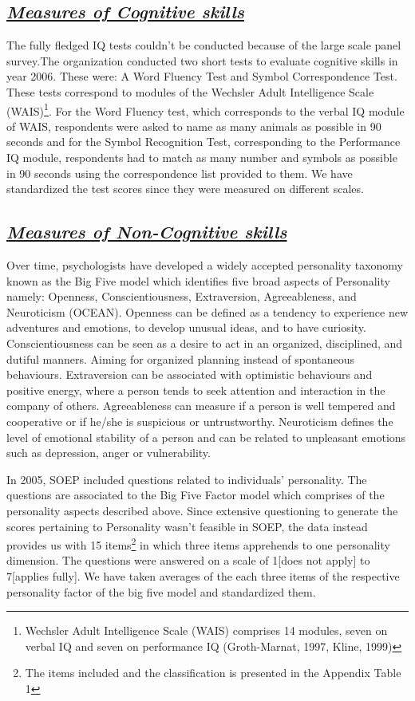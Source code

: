 \documentclass[11pt, a4paper, leqno]{article}
\begin{document}
\subsection*{\textit{\underline{Measures of Cognitive skills}}}
The fully fledged IQ tests couldn’t be conducted because of the large scale panel survey.The organization conducted two short tests to evaluate cognitive skills in year 2006. These were: A Word Fluency Test and Symbol Correspondence Test. These tests correspond to modules  of the Wechsler Adult Intelligence Scale (WAIS)\footnote{Wechsler Adult Intelligence Scale (WAIS) comprises 14 modules, seven on verbal IQ and seven on performance IQ (Groth-Marnat, 1997, Kline, 1999)}. 
For the Word Fluency test, which corresponds to the verbal IQ module of WAIS, respondents were asked to name as many animals as possible in 90 seconds and for the Symbol Recognition Test, corresponding to the Performance IQ module, respondents had to match as many number and symbols as possible in 90 seconds using the correspondence list provided to them. We have standardized the test scores since they were measured on different scales.

\subsection*{\textit{\underline{Measures of Non-Cognitive skills}}}

Over time, psychologists have developed a widely accepted personality taxonomy known as the Big Five model which identifies five broad aspects of Personality namely: Openness, Conscientiousness, Extraversion, Agreeableness, and Neuroticism 
(OCEAN). Openness can be defined as a tendency to experience new adventures and emotions, to develop unusual ideas, and to have curiosity. Conscientiousness can be seen as a desire to act in an organized, disciplined, and dutiful manners. Aiming for organized planning instead of spontaneous behaviours. Extraversion can be associated with optimistic behaviours and positive energy, where a person tends to seek attention and interaction in the company of others. Agreeableness can measure if a person is well tempered and cooperative or if he/she is suspicious or untrustworthy. Neuroticism defines the level of emotional stability of a person and can be related to unpleasant emotions such as depression, anger or vulnerability. \par
In 2005, SOEP included questions related to individuals’ personality. The questions are associated to the Big Five Factor model which comprises of the personality aspects described above. Since extensive questioning to generate the scores pertaining to Personality wasn’t feasible in SOEP, the data instead provides us with 15 items\footnote{The items included and the classification is presented in the Appendix Table 1} in which three items apprehends to one personality dimension. The questions were answered on a scale of 1[does not apply] to 7[applies fully]. We have taken averages of the each three items of the respective personality factor of the big five model and standardized them. 
\end{document}

